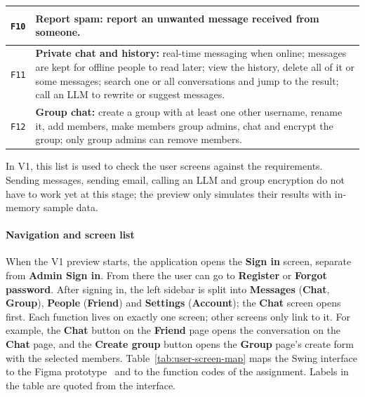 \begin{longtable}{|C{1.2cm}|L{\dimexpr\textwidth-1.2cm-4\arrayrulewidth\relax}|}
  \hline
  \hypertarget{F10}{\texttt{F10}} &
  \textbf{Report spam:} report an unwanted message received from someone.\\
  \hline
  \hypertarget{F11}{\texttt{F11}} &
  \textbf{Private chat and history:} real-time messaging when online; messages are
  kept for offline people to read later; view the history, delete all of it or some
  messages; search one or all conversations and jump to the result; call an LLM to
  rewrite or suggest messages.\\
  \hline
  \hypertarget{F12}{\texttt{F12}} &
  \textbf{Group chat:} create a group with at least one other username, rename it,
  add members, make members group admins, chat and encrypt the group; only group
  admins can remove members.\\
  \hline
\end{longtable}
\endgroup

In V1, this list is used to check the user screens against the requirements.
Sending messages, sending email, calling an LLM and group encryption do not have to
work yet at this stage; the preview only simulates their results with in-memory
sample data.

\paragraph{Navigation and screen list}
\label{par:user-navigation}
\mbox{}\par
When the V1 preview starts, the application opens the \textbf{Sign in} screen,
separate from \textbf{Admin Sign in}. From there the user can go to \textbf{Register}
or \textbf{Forgot password}. After signing in, the left sidebar is split into
\textbf{Messages} (\textbf{Chat}, \textbf{Group}), \textbf{People}
(\textbf{Friend}) and \textbf{Settings} (\textbf{Account}); the \textbf{Chat} screen
opens first. Each function lives on exactly one screen; other screens only link to
it. For example, the \textbf{Chat} button on the \textbf{Friend} page opens the
conversation on the \textbf{Chat} page, and the \textbf{Create group} button opens
the \textbf{Group} page's create form with the selected members.
Table~\ref{tab:user-screen-map} maps the Swing interface to the Figma prototype~\cite{ref:figma} and
to the function codes of the assignment. Labels in the table are quoted from the
interface.

